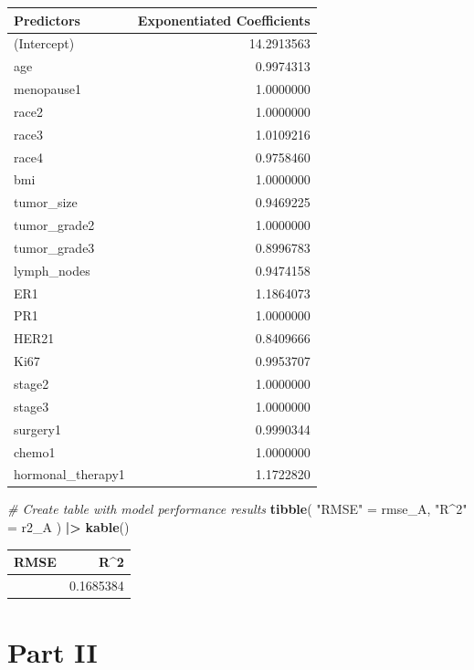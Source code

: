 \documentclass[
]{article}
\newenvironment{Shaded}{\begin{snugshade}}{\end{snugshade}}
\newcommand{\CommentTok}[1]{\textcolor[rgb]{0.56,0.35,0.01}{\textit{#1}}}
\newcommand{\FunctionTok}[1]{\textcolor[rgb]{0.13,0.29,0.53}{\textbf{#1}}}
\newcommand{\NormalTok}[1]{#1}
\newcommand{\OtherTok}[1]{\textcolor[rgb]{0.56,0.35,0.01}{#1}}
\newcommand{\SpecialCharTok}[1]{\textcolor[rgb]{0.81,0.36,0.00}{\textbf{#1}}}
\newcommand{\StringTok}[1]{\textcolor[rgb]{0.31,0.60,0.02}{#1}}
\begin{document}
\begin{longtable}[]{@{}lr@{}}
\toprule\noalign{}
Predictors & Exponentiated Coefficients \\
\midrule\noalign{}
\endhead
\bottomrule\noalign{}
\endlastfoot
(Intercept) & 14.2913563 \\
age & 0.9974313 \\
menopause1 & 1.0000000 \\
race2 & 1.0000000 \\
race3 & 1.0109216 \\
race4 & 0.9758460 \\
bmi & 1.0000000 \\
tumor\_size & 0.9469225 \\
tumor\_grade2 & 1.0000000 \\
tumor\_grade3 & 0.8996783 \\
lymph\_nodes & 0.9474158 \\
ER1 & 1.1864073 \\
PR1 & 1.0000000 \\
HER21 & 0.8409666 \\
Ki67 & 0.9953707 \\
stage2 & 1.0000000 \\
stage3 & 1.0000000 \\
surgery1 & 0.9990344 \\
chemo1 & 1.0000000 \\
hormonal\_therapy1 & 1.1722820 \\
\end{longtable}

\begin{Shaded}
\begin{Highlighting}[]
\CommentTok{\# Create table with model performance results}
\FunctionTok{tibble}\NormalTok{(}
  \StringTok{"RMSE"} \OtherTok{=}\NormalTok{ rmse\_A,}
  \StringTok{"R\^{}2"} \OtherTok{=}\NormalTok{ r2\_A}
\NormalTok{) }\SpecialCharTok{|\textgreater{}} 
  \FunctionTok{kable}\NormalTok{()}
\end{Highlighting}
\end{Shaded}

\begin{longtable}[]{@{}rr@{}}
\toprule\noalign{}
RMSE & R\^{}2 \\
\midrule\noalign{}
\endhead
\bottomrule\noalign{}
\endlastfoot
0.7465867 & 0.1685384 \\
\end{longtable}

\section{Part II}\label{part-ii}
\end{document}
